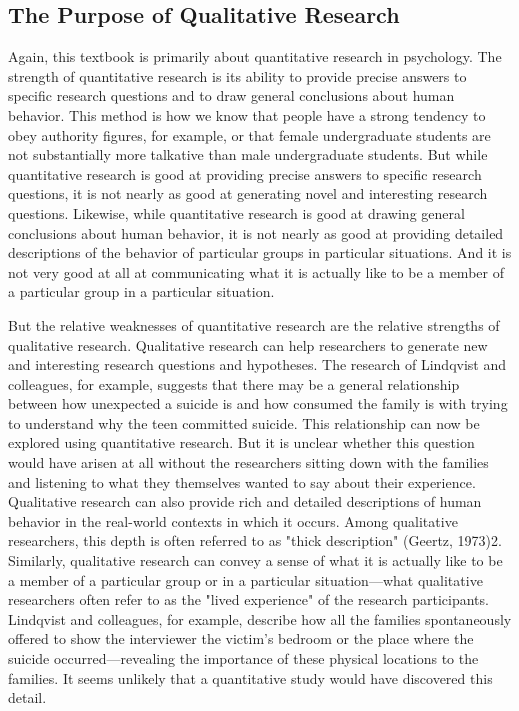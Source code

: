 \subsection{The Purpose of Qualitative Research}

Again, this textbook is primarily about quantitative research in psychology. The strength of quantitative research is its ability to provide precise answers to specific research questions and to draw general conclusions about human behavior. This method is how we know that people have a strong tendency to obey authority figures, for example, or that female undergraduate students are not substantially more talkative than male undergraduate students. But while quantitative research is good at providing precise answers to specific research questions, it is not nearly as good at generating novel and interesting research questions. Likewise, while quantitative research is good at drawing general conclusions about human behavior, it is not nearly as good at providing detailed descriptions of the behavior of particular groups in particular situations. And it is not very good at all at communicating what it is actually like to be a member of a particular group in a particular situation.

But the relative weaknesses of quantitative research are the relative strengths of qualitative research. Qualitative research can help researchers to generate new and interesting research questions and hypotheses. The research of Lindqvist and colleagues, for example, suggests that there may be a general relationship between how unexpected a suicide is and how consumed the family is with trying to understand why the teen committed suicide. This relationship can now be explored using quantitative research. But it is unclear whether this question would have arisen at all without the researchers sitting down with the families and listening to what they themselves wanted to say about their experience. Qualitative research can also provide rich and detailed descriptions of human behavior in the real-world contexts in which it occurs. Among qualitative researchers, this depth is often referred to as "thick description" (Geertz, 1973)2. Similarly, qualitative research can convey a sense of what it is actually like to be a member of a particular group or in a particular situation---what qualitative researchers often refer to as the "lived experience" of the research participants. Lindqvist and colleagues, for example, describe how all the families spontaneously offered to show the interviewer the victim's bedroom or the place where the suicide occurred---revealing the importance of these physical locations to the families. It seems unlikely that a quantitative study would have discovered this detail.

